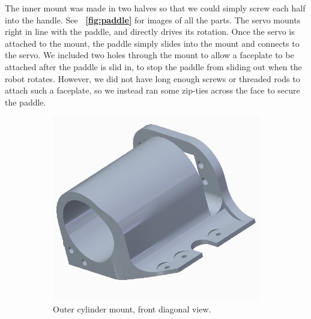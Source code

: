 \documentclass[letterpaper, 11pt]{article}
\newcommand*{\figref}[1]{\textbf{\figurename~\ref{#1}}}
\begin{document}
\begin{enumerate}[label=\textbf{\arabic*.}]
The inner mount was made in two halves so that we could simply screw each half into the handle. See \figref{fig:paddle} for images of all the parts. The servo mounts right in line with the paddle, and directly drives its rotation. Once the servo is attached to the mount, the paddle simply slides into the mount and connects to the servo. We included two holes through the mount to allow a faceplate to be attached after the paddle is slid in, to stop the paddle from sliding out when the robot rotates. However, we did not have long enough screws or threaded rods to attach such a faceplate, so we instead ran some zip-ties across the face to secure the paddle.

\begin{figure}[ht]
    \centering
    \begin{subfigure}[t]{0.48\textwidth}
        \centering
        \includegraphics[height=0.25\textheight]{images/outer-mount1.png}
        \caption{Outer cylinder mount, front diagonal view.}
    \end{subfigure}\hfill
    \begin{subfigure}[t]{0.48\textwidth}
        \centering

\end{subfigure}
\end{figure}
\end{enumerate}
\end{document}
